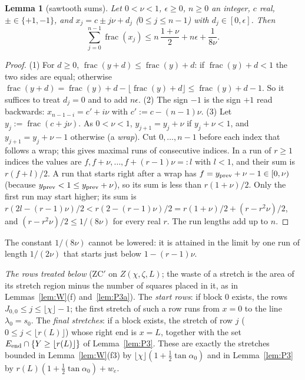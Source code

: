 \documentclass[11pt]{amsart}
\newcommand{\taz}{\tan\alpha_0}
\newtheorem{lemma}[theorem]{Lemma}
\theoremstyle{definition}
\theoremstyle{remark}
\numberwithin{equation}{section}
\begin{document}
\begin{lemma}[sawtooth sums]\label{lem:SL}
Let $0<\nu<1$, $\epsilon\ge0$, $n\ge0$ an integer, $c$ real, $\pm\in\{+1,-1\}$, and $x_j=c\pm j\nu+d_j$ ($0\le j\le n-1$)
with $d_j\in[0,\epsilon]$. Then
\[
\sum_{j=0}^{n-1}\operatorname{frac}(x_j)\le n\,\frac{1+\nu}2+n\epsilon+\frac1{8\nu}.
\]
\end{lemma}

\begin{proof}
(1) For $d\ge0$, $\operatorname{frac}(y+d)\le\operatorname{frac}(y)+d$: if $\operatorname{frac}(y)+d<1$ the two sides are
equal; otherwise $\operatorname{frac}(y+d)=\operatorname{frac}(y)+d-\lfloor\operatorname{frac}(y)+d\rfloor\le
\operatorname{frac}(y)+d-1$. So it suffices to treat $d_j=0$ and to add $n\epsilon$. (2) The sign $-1$ is the sign $+1$
read backwards: $x_{n-1-i}=c'+i\nu$ with $c':=c-(n-1)\nu$. (3) Let $y_j:=\operatorname{frac}(c+j\nu)$. As $0<\nu<1$,
$y_{j+1}=y_j+\nu$ if $y_j+\nu<1$, and $y_{j+1}=y_j+\nu-1$ otherwise (a \emph{wrap}). Cut $0,\dots,n-1$ before each index
that follows a wrap; this gives maximal runs of consecutive indices. In a run of $r\ge1$ indices the values are
$f,f+\nu,\dots,f+(r-1)\nu=:l$ with $l<1$, and their sum is $r(f+l)/2$. A run that starts right after a wrap has
$f=y_{\rm prev}+\nu-1\in[0,\nu)$ (because $y_{\rm prev}<1\le y_{\rm prev}+\nu$), so its sum is less than $r(1+\nu)/2$. Only
the first run may start higher; its sum is $r(2l-(r-1)\nu)/2<r(2-(r-1)\nu)/2=r(1+\nu)/2+(r-r^2\nu)/2$, and
$(r-r^2\nu)/2\le1/(8\nu)$ for every real $r$. The run lengths add up to $n$.
\end{proof}

The constant $1/(8\nu)$ cannot be lowered: it is attained in the limit by one run of length $1/(2\nu)$ that starts just
below $1-(r-1)\nu$.

\emph{The rows treated below} (ZC$'$ on $Z(\chi,\zeta,L)$; the waste of a stretch is the area of its stretch region minus
the number of squares placed in it, as in Lemmas~\ref{lem:W}(f) and~\ref{lem:P3a}). The \emph{start rows}: if block $0$
exists, the rows $J_{0,0}\le j\le\lfloor\chi\rfloor-1$; the first stretch of such a row runs from $x=0$ to the line
$\lambda_0=s_0$. The \emph{final stretches}: if a block exists, the stretch of row $j$ ($0\le j<\lfloor r(L)\rfloor$)
whose right end is $x=L$, together with the set $E_{\rm end}\cap\{Y\ge\lfloor r(L)\rfloor\}$ of Lemma~\ref{lem:P3}. These
are exactly the stretches bounded in Lemma~\ref{lem:W}(f3) by $\lfloor\chi\rfloor(1+\frac12\taz)$ and in
Lemma~\ref{lem:P3} by $r(L)(1+\frac12\taz)+w_e$.
\end{document}
